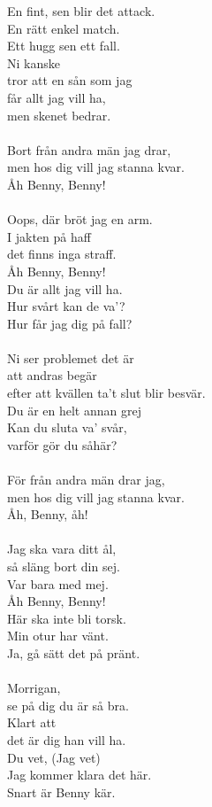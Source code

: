 \documentclass[a6paper, 10pt, twoside]{article}
\begin{document}
\begin{center}
\end{center}
\begin{lyrics}
En fint, sen blir det attack. \\
En rätt enkel match. \\
Ett hugg sen ett fall. \\
Ni kanske \\
tror att en sån som jag \\
får allt jag vill ha, \\
men skenet bedrar. \\
\\
Bort från andra män jag drar, \\
men hos dig vill jag stanna kvar. \\
Åh Benny, Benny! \\
\\
Oops, där bröt jag en arm. \\
I jakten på haff \\
det finns inga straff. \\
Åh Benny, Benny! \\
Du är allt jag vill ha. \\
Hur svårt kan de va’? \\
Hur får jag dig på fall? \\
\\
Ni ser problemet det är \\
att andras begär \\
efter att kvällen ta’t slut blir besvär. \\
Du är en helt annan grej \\
Kan du sluta va' svår, \\
varför gör du såhär? \\
\\
För från andra män drar jag, \\
men hos dig vill jag stanna kvar. \\
Åh, Benny, åh! \\
\\
Jag ska vara ditt ål,\\
så släng bort din sej. \\ 
Var bara med mej. \\
Åh Benny, Benny! \\
Här ska inte bli torsk. \\
Min otur har vänt. \\
Ja, gå sätt det på pränt. \\
\\
Morrigan, \\
se på dig du är så bra. \\
Klart att \\
det är dig han vill ha. \\
Du vet, (Jag vet) \\
Jag kommer klara det här. \\
Snart är Benny kär.
\end{lyrics}
\end{document}
